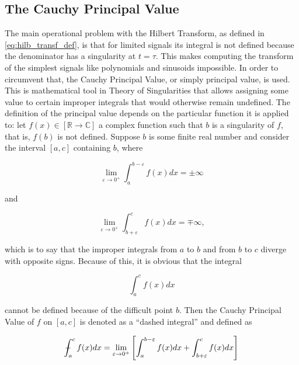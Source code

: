 \subsection{The Cauchy Principal Value} %

	The main operational problem with the Hilbert Transform, as defined in \eqref{eq:hilb_transf_def}, is that for limited signals its integral is not defined because the denominator has a singularity at $t=\tau$. This makes computing the transform of the simplest signals like polynomials and sinusoids impossible. In order to circumvent that, the Cauchy Principal Value, or simply principal value, is used. This is mathematical tool in Theory of Singularities that allows assigning some value to certain improper integrals that would otherwise remain undefined. The definition of the principal value depends on the particular function it is applied to: let $f(x)\in\left[\mathbb{R}\to\mathbb{C}\right]$ a complex function such that $b$ is a singularity of $f$, that is, $f(b)$ is not defined. Suppose $b$ is some finite real number and consider the interval $\left[a,c\right]$ containing $b$, where

\begin{equation} \lim\limits_{\varepsilon\to 0^+} \int_{a}^{b-\varepsilon} f(x)dx = \pm \infty\end{equation}

	\noindent and

\begin{equation} \lim\limits_{\varepsilon\to 0^+} \int_{b+\varepsilon}^{c} f(x)dx = \mp \infty,\end{equation}

	\noindent which is to say that the improper integrals from $a$ to $b$ and from $b$ to $c$ diverge with opposite signs. Because of this, it is obvious that the integral

\begin{equation} \int_{a}^{c} f(x)dx \label{eq:hilbert_transform_impossible_integral} \end{equation}

	\noindent cannot be defined because of the difficult point $b$. Then the Cauchy Principal Value of $f$ on $\left[a,c\right]$ is denoted as a ``dashed integral'' and defined as

\begin{equation} \dashint_{a}^{c} f(x)dx = \lim\limits_{\varepsilon\to 0^+} \left[\int_{a}^{b-\varepsilon} f(x)dx + \int_{b+\varepsilon}^{c} f(x)dx  \right]\end{equation}

